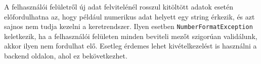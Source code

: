 
A felhasználói felületről új adat felvitelénél rosszul kitöltött adatok esetén előfordulhatna az, hogy például numerikus adat helyett egy string érkezik, és azt sajnos nem tudja kezelni a keretrendszer. Ilyen esetben \texttt{NumberFormatException} keletkezik, ha a felhasználói felületen minden beviteli mezőt szigorúan validálunk, akkor ilyen nem fordulhat elő. Esetleg érdemes lehet kivételkezelést is használni a backend oldalon, ahol ez bekövetkezhet. 

